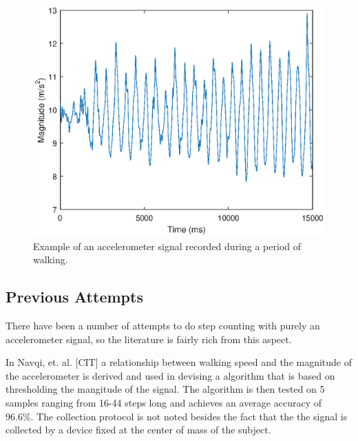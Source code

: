                 \begin{figure}[h]
                    \includegraphics[width=\textwidth]{Images/accel_signal.eps}
                    \centering
                    \caption{Example of an accelerometer signal recorded during a period of walking.}
                    \label{img_accel_ex}
                \end{figure}

            \subsection{Previous Attempts}

                There have been a number of attempts to do step counting with purely an accelerometer signal, so the literature is fairly rich from this aspect. 

                In Navqi, et. al. [CIT] a relationship between walking speed and the magnitude of the accelerometer is derived and used in devising a algorithm that is based on thresholding the mangitude of the signal. The algorithm is then tested on 5 samples ranging from 16-44 steps long and achieves an average accuracy of 96.6\%. The collection protocol is not noted besides the fact that the the signal is collected by a device fixed at the center of mass of the subject. 

